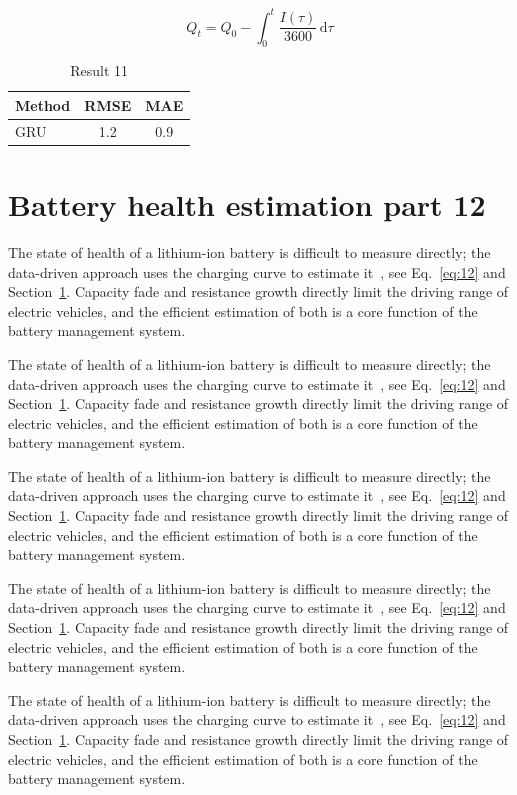\documentclass[11pt]{article}
\begin{document}
\begin{equation}\label{eq:11}
  Q_t = Q_0 - \int_0^t \frac{I(\tau)}{3600}\,\mathrm{d}\tau
\end{equation}
\begin{table}[h]\centering\begin{tabular}{lcc}\toprule Method & RMSE & MAE\\\midrule GRU & 1.2 & 0.9\\\bottomrule\end{tabular}\caption{Result 11}\end{table}

\section{Battery health estimation part 12}\label{sec:12}
The state of health of a lithium-ion battery is difficult to measure directly; the data-driven approach uses the charging curve to estimate it~\cite{a2020}, see Eq.~\eqref{eq:12} and Section~\ref{sec:12}. Capacity fade and resistance growth directly limit the driving range of electric vehicles, and the efficient estimation of both is a core function of the battery management system.

The state of health of a lithium-ion battery is difficult to measure directly; the data-driven approach uses the charging curve to estimate it~\cite{a2020}, see Eq.~\eqref{eq:12} and Section~\ref{sec:12}. Capacity fade and resistance growth directly limit the driving range of electric vehicles, and the efficient estimation of both is a core function of the battery management system.

The state of health of a lithium-ion battery is difficult to measure directly; the data-driven approach uses the charging curve to estimate it~\cite{a2020}, see Eq.~\eqref{eq:12} and Section~\ref{sec:12}. Capacity fade and resistance growth directly limit the driving range of electric vehicles, and the efficient estimation of both is a core function of the battery management system.

The state of health of a lithium-ion battery is difficult to measure directly; the data-driven approach uses the charging curve to estimate it~\cite{a2020}, see Eq.~\eqref{eq:12} and Section~\ref{sec:12}. Capacity fade and resistance growth directly limit the driving range of electric vehicles, and the efficient estimation of both is a core function of the battery management system.

The state of health of a lithium-ion battery is difficult to measure directly; the data-driven approach uses the charging curve to estimate it~\cite{a2020}, see Eq.~\eqref{eq:12} and Section~\ref{sec:12}. Capacity fade and resistance growth directly limit the driving range of electric vehicles, and the efficient estimation of both is a core function of the battery management system.
\end{document}
